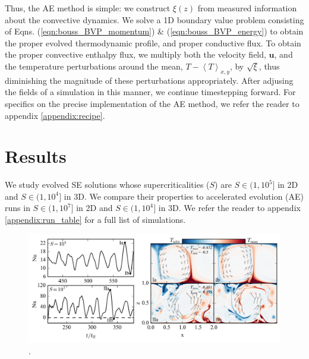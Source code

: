 \documentclass[aps, pre, onecolumn, nofootinbib, notitlepage, groupedaddress, amsfonts, amssymb, amsmath, longbibliography]{revtex4-1}
\newcommand{\angles}[1]{\ensuremath{\left\langle #1 \right\rangle}}
\begin{document}
Thus, the AE method is simple: we construct $\xi(z)$ from measured information about
the convective dynamics. We solve a 1D boundary value problem consisting of
Eqns. (\ref{eqn:bouss_BVP_momentum}) \& (\ref{eqn:bouss_BVP_energy})
to obtain the proper evolved thermodynamic profile, and proper conductive flux.
To obtain the proper convective enthalpy flux, we multiply both the velocity field,
$\bm{u}$, and the temperature perturbations around the mean, $T - \angles{T}_{x,y}$,
by $\sqrt{\xi}$, thus diminishing the magnitude of these perturbations appropriately.
After adjusing the fields of a simulation in this manner, we continue timestepping forward.
For specifics on the precise implementation of the AE method, we refer
the reader to appendix \ref{appendix:recipe}.


\vspace{-0.5cm}
\section{Results}
\label{sec:results}
We study evolved SE solutions whose supercriticalities ($S$) are 
$S \in (1, 10^5]$ in 2D and $S \in (1, 10^4]$ in
3D. We compare their properties to
accelerated evolution (AE) runs in $S \in (1, 10^7]$ in 2D and
$S \in (1, 10^4]$ in 3D.
We refer the reader to appendix \ref{appendix:run_table} for a full list of
simulations.

\begin{figure}[t!]
\includegraphics[width=\textwidth]{./figs/oscillating_plumes.png}
\caption{. \label{fig:oscillating_plumes} }
\end{figure}
\end{document}
